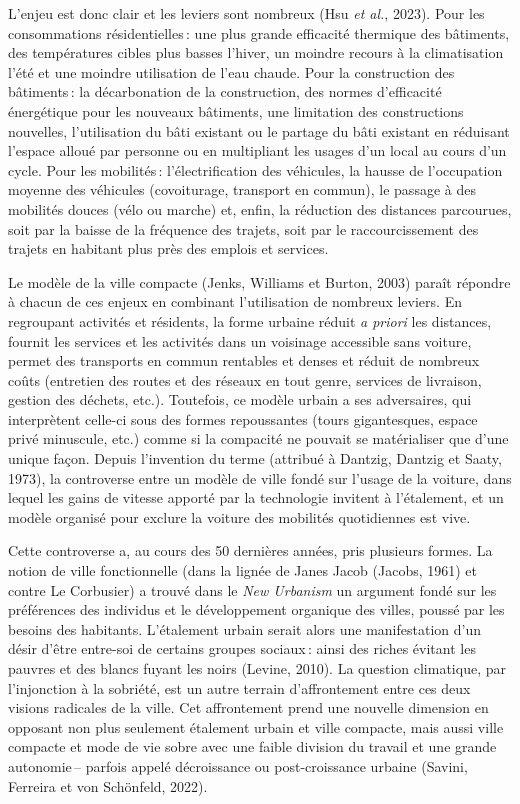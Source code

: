 \documentclass[
  9pt,
  a4paper,
  DIV=11]{scrreprt}
\begin{document}
L'enjeu est donc clair et les leviers sont nombreux (Hsu \emph{et al.},
2023). Pour les consommations résidentielles\,: une plus grande
efficacité thermique des bâtiments, des températures cibles plus basses
l'hiver, un moindre recours à la climatisation l'été et une moindre
utilisation de l'eau chaude. Pour la construction des bâtiments\,: la
décarbonation de la construction, des normes d'efficacité énergétique
pour les nouveaux bâtiments, une limitation des constructions nouvelles,
l'utilisation du bâti existant ou le partage du bâti existant en
réduisant l'espace alloué par personne ou en multipliant les usages d'un
local au cours d'un cycle. Pour les mobilités\,: l'électrification des
véhicules, la hausse de l'occupation moyenne des véhicules (covoiturage,
transport en commun), le passage à des mobilités douces (vélo ou marche)
et, enfin, la réduction des distances parcourues, soit par la baisse de
la fréquence des trajets, soit par le raccourcissement des trajets en
habitant plus près des emplois et services.

Le modèle de la ville compacte (Jenks, Williams et Burton, 2003) paraît
répondre à chacun de ces enjeux en combinant l'utilisation de nombreux
leviers. En regroupant activités et résidents, la forme urbaine réduit
\emph{a priori} les distances, fournit les services et les activités
dans un voisinage accessible sans voiture, permet des transports en
commun rentables et denses et réduit de nombreux coûts (entretien des
routes et des réseaux en tout genre, services de livraison, gestion des
déchets, etc.). Toutefois, ce modèle urbain a ses adversaires, qui
interprètent celle-ci sous des formes repoussantes (tours gigantesques,
espace privé minuscule, etc.) comme si la compacité ne pouvait se
matérialiser que d'une unique façon. Depuis l'invention du terme
(attribué à Dantzig, Dantzig et Saaty, 1973), la controverse entre un
modèle de ville fondé sur l'usage de la voiture, dans lequel les gains
de vitesse apporté par la technologie invitent à l'étalement, et un
modèle organisé pour exclure la voiture des mobilités quotidiennes est
vive.

Cette controverse a, au cours des 50 dernières années, pris plusieurs
formes. La notion de ville fonctionnelle (dans la lignée de Janes Jacob
(Jacobs, 1961) et contre Le Corbusier) a trouvé dans le \emph{New
Urbanism} un argument fondé sur les préférences des individus et le
développement organique des villes, poussé par les besoins des
habitants. L'étalement urbain serait alors une manifestation d'un désir
d'être entre-soi de certains groupes sociaux\,: ainsi des riches évitant
les pauvres et des blancs fuyant les noirs (Levine, 2010). La question
climatique, par l'injonction à la sobriété, est un autre terrain
d'affrontement entre ces deux visions radicales de la ville. Cet
affrontement prend une nouvelle dimension en opposant non plus seulement
étalement urbain et ville compacte, mais aussi ville compacte et mode de
vie sobre avec une faible division du travail et une grande
autonomie\,-- parfois appelé décroissance ou post-croissance urbaine
(Savini, Ferreira et von Schönfeld, 2022).
\end{document}
